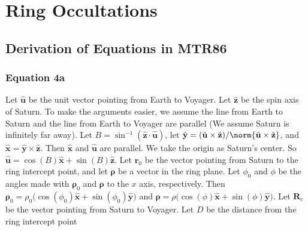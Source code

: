 \documentclass[crop=false,class=article,oneside]{standalone}
\begin{document}
    \ifx\ifresearchnotesosthemathematicsofcassini\undefined
        \section*{Ring Occultations}
        \setcounter{section}{1}
        \renewcommand\thesubfigure{%
            \arabic{section}.\arabic{figure}.\arabic{subfigure}%
        }
    \fi
    \subsection{Derivation of Equations in MTR86}
        \subsubsection{Equation 4a}
            Let $\hat{\mathbf{u}}$ be the unit
            vector pointing from Earth to Voyager.
            Let $\hat{\mathbf{z}}$ be the spin axis of
            Saturn. To make the arguments easier,
            we assume the line from Earth to Saturn
            and the line from Earth to Voyager are
            parallel (We assume Saturn is infinitely far away).
            Let
            $B=\sin^{-1}(\hat{\mathbf{z}}\cdot \hat{\mathbf{u}})$,
            let
            $\hat{\mathbf{y}}%
             =(\hat{\mathbf{u}}\times%
              \hat{\mathbf{z}})/%
              \norm{\hat{\mathbf{u}}\times%
              \hat{\mathbf{z}}}$,
            and
            $\hat{\mathbf{x}}%
             =\hat{\mathbf{y}}\times \hat{\mathbf{z}}$.
            Then $\hat{\mathbf{x}}$ and $\hat{\mathbf{u}}$
            are parallel. We take the origin as Saturn's center.
            So
            $\hat{\mathbf{u}}%
             =\cos(B)\hat{\mathbf{x}}+\sin(B)\hat{\mathbf{z}}$.
            Let $\mathbf{r}_{0}$ be the vector pointing
            from Saturn to the ring intercept point,
            and let $\boldsymbol{\rho}$ be a vector in
            the ring plane. Let $\phi_{0}$ and
            $\phi$ be the angles made with
            $\boldsymbol{\rho}_{0}$ and $\boldsymbol{\rho}$
            to the $x$ axis, respectively. Then
            $\boldsymbol{\rho}_{0}%
             =\rho_{0}\big(\cos(\phi_0)\hat{\mathbf{x}}+%
              \sin(\phi_{0})\hat{\mathbf{y}}\big)$
            and
            $\boldsymbol{\rho}%
             =\rho\big(\cos(\phi)\hat{\mathbf{x}}+%
              \sin(\phi)\hat{\mathbf{y}}\big)$.
            Let $\mathbf{R}_{c}$ be the vector pointing
            from Saturn to Voyager. Let $D$ be the
            distance from the ring intercept point
\end{document}
